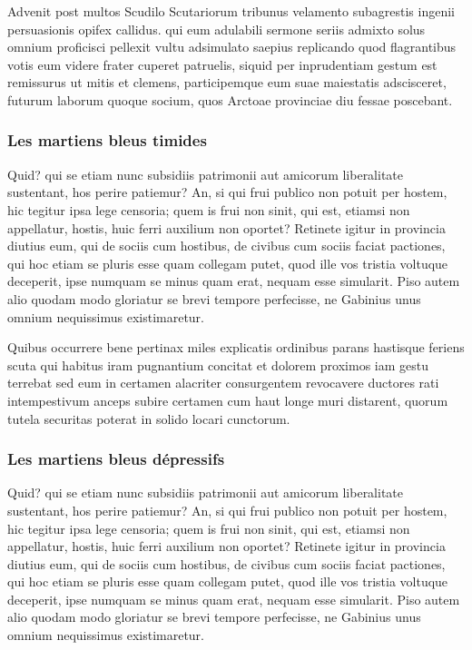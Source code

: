\documentclass{framatexclass}
\begin{document}
Advenit post multos Scudilo Scutariorum tribunus velamento subagrestis ingenii persuasionis opifex callidus. qui eum adulabili sermone seriis admixto solus omnium proficisci pellexit vultu adsimulato saepius replicando quod flagrantibus votis eum videre frater cuperet patruelis, siquid per inprudentiam gestum est remissurus ut mitis et clemens, participemque eum suae maiestatis adscisceret, futurum laborum quoque socium, quos Arctoae provinciae diu fessae poscebant.


\subsubsection{Les martiens bleus timides}
Quid? qui se etiam nunc subsidiis patrimonii aut amicorum liberalitate sustentant, hos perire patiemur? An, si qui frui publico non potuit per hostem, hic tegitur ipsa lege censoria; quem is frui non sinit, qui est, etiamsi non appellatur, hostis, huic ferri auxilium non oportet? Retinete igitur in provincia diutius eum, qui de sociis cum hostibus, de civibus cum sociis faciat pactiones, qui hoc etiam se pluris esse quam collegam putet, quod ille vos tristia voltuque deceperit, ipse numquam se minus quam erat, nequam esse simularit. Piso autem alio quodam modo gloriatur se brevi tempore perfecisse, ne Gabinius unus omnium nequissimus existimaretur.

Quibus occurrere bene pertinax miles explicatis ordinibus parans hastisque feriens scuta qui habitus iram pugnantium concitat et dolorem proximos iam gestu terrebat sed eum in certamen alacriter consurgentem revocavere ductores rati intempestivum anceps subire certamen cum haut longe muri distarent, quorum tutela securitas poterat in solido locari cunctorum.


\subsubsection{Les martiens bleus dépressifs}
Quid? qui se etiam nunc subsidiis patrimonii aut amicorum liberalitate sustentant, hos perire patiemur? An, si qui frui publico non potuit per hostem, hic tegitur ipsa lege censoria; quem is frui non sinit, qui est, etiamsi non appellatur, hostis, huic ferri auxilium non oportet? Retinete igitur in provincia diutius eum, qui de sociis cum hostibus, de civibus cum sociis faciat pactiones, qui hoc etiam se pluris esse quam collegam putet, quod ille vos tristia voltuque deceperit, ipse numquam se minus quam erat, nequam esse simularit. Piso autem alio quodam modo gloriatur se brevi tempore perfecisse, ne Gabinius unus omnium nequissimus existimaretur.
\end{document}
